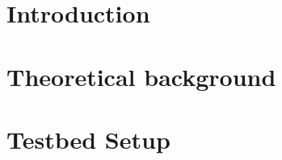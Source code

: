 \documentclass[12pt]{article}
\begin{document}
\section{Introduction} \label{intro}
	

\section{Theoretical background} \label{theory}
	

\section{Testbed Setup} \label{setup}
	
\end{document}
